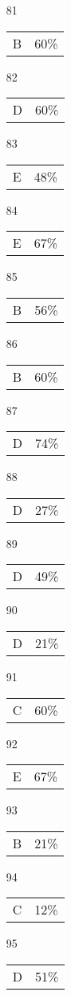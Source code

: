 \documentclass[12pt]{article}
\begin{document}
\begin{multicols}{5}
\begin{enumerate}
\item[81] \begin{tabular}{cc} B & 60\%\end{tabular}
\item[82] \begin{tabular}{cc} D & 60\%\end{tabular}
\item[83] \begin{tabular}{cc} E & 48\%\end{tabular}
\item[84] \begin{tabular}{cc} E & 67\%\end{tabular}
\item[85] \begin{tabular}{cc} B & 56\%\end{tabular}
\item[]
\item[86] \begin{tabular}{cc} B & 60\%\end{tabular}
\item[87] \begin{tabular}{cc} D & 74\%\end{tabular}
\item[88] \begin{tabular}{cc} D & 27\%\end{tabular}
\item[89] \begin{tabular}{cc} D & 49\%\end{tabular}
\item[90] \begin{tabular}{cc} D & 21\%\end{tabular}
\item[]
\item[91] \begin{tabular}{cc} C & 60\%\end{tabular}
\item[92] \begin{tabular}{cc} E & 67\%\end{tabular}
\item[93] \begin{tabular}{cc} B & 21\%\end{tabular}
\item[94] \begin{tabular}{cc} C & 12\%\end{tabular}
\item[95] \begin{tabular}{cc} D & 51\%\end{tabular}

\end{enumerate}
\end{multicols}
\end{document}
